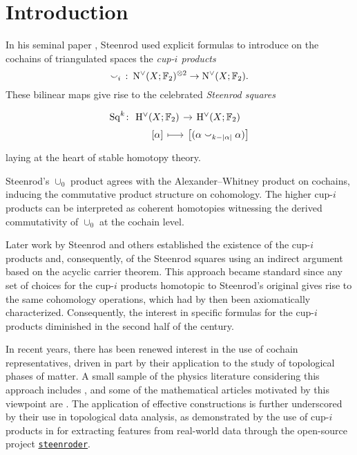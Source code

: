 
\section{Introduction}\label{s:introduction}

In his seminal paper \cite{steenrod1947products}, Steenrod used explicit formulas to introduce on the cochains of triangulated spaces the \textit{cup-$i$ products}
\[
\smallsmile_i\ \colon \operatorname{N^{\vee}}(X; {\mathbb{F}_2})^{\otimes 2} \to \operatorname{N^{\vee}}(X; {\mathbb{F}_2}).
\]
These bilinear maps give rise to the celebrated \textit{Steenrod squares}
\[
\begin{tikzcd}[column sep=0, row sep=0]
	\Sq^k \colon &[-5pt] \rH^\vee(X; \F) \rar & \rH^\vee(X; \F) \\
	& {[\alpha]} \rar[maps to] & \big[(\alpha \cup_{k-\bars{\alpha}} \alpha)\big]
\end{tikzcd}
\]
laying at the heart of stable homotopy theory.

Steenrod's $\cup_0$ product agrees with the Alexander--Whitney product on cochains, inducing the commutative product structure on cohomology.
The higher cup-$i$ products can be interpreted as coherent homotopies witnessing the derived commutativity of $\cup_0$ at the cochain level.

Later work by Steenrod and others established the existence of the cup-$i$ products and, consequently, of the Steenrod squares using an indirect argument based on the acyclic carrier theorem.
This approach became standard since any set of choices for the cup-$i$ products homotopic to Steenrod's original gives rise to the same cohomology operations, which had by then been axiomatically characterized.
Consequently, the interest in specific formulas for the cup-$i$ products diminished in the second half of the century.

In recent years, there has been renewed interest in the use of cochain representatives, driven in part by their application to the study of topological phases of matter.
A small sample of the physics literature considering this approach includes \cite{gaiotto2016spin, kapustin2017fermionic, meng2018classification, wang2020construction, barkeshli2021classification, tata2021anomalies, tata2021cubical}, and some of the mathematical articles motivated by this viewpoint are \cite{brumfiel2016pontrjagin, brumfiel2018pontrjagin, medina2020cartan, medina2021adem}. 
The application of effective constructions is further underscored by their use in topological data analysis, as demonstrated by the use of cup-$i$ products in \cite{medina2022per_st} for extracting features from real-world data through the open-source project \href{https://github.com/Steenroder/steenroder}{\texttt{steenroder}}.

